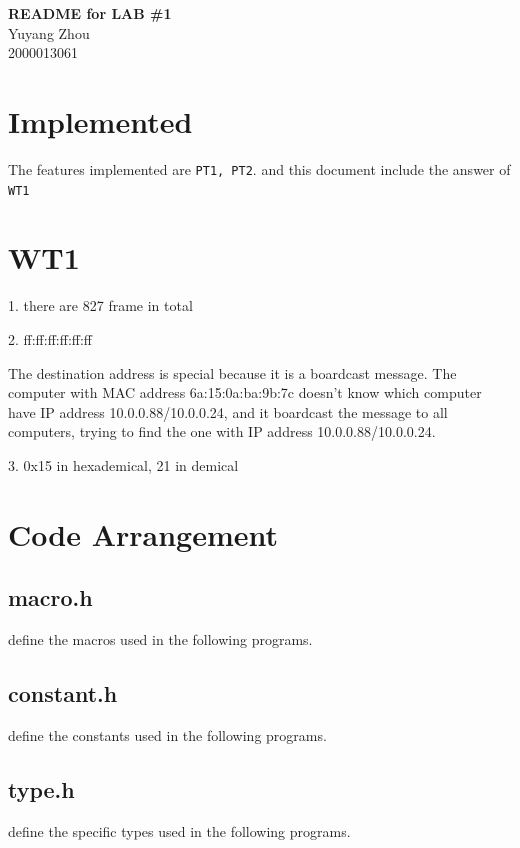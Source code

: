 \documentclass[11pt]{article}
\newcommand{\labid}{1}			%
\newcommand{\name}{Yuyang Zhou} 		%
\newcommand{\id}{2000013061} 	%
\begin{document}
    \pagestyle{fancy}
    \chead{}

    \begin{center}
        {\LARGE \bf README for LAB \#\labid}\\
        {\Large \name}\\
        {\Large \id}\\
    \end{center}

	\section{Implemented}
		\par The features implemented are \texttt{PT1, PT2}. and this document include the answer of \texttt{WT1}
		
	\section{WT1}
	
		\par 1. there are 827 frame in total
		\par 2. ff:ff:ff:ff:ff:ff
		
		The destination address is special because it is a boardcast message. 
		The computer with MAC address 6a:15:0a:ba:9b:7c doesn't know which computer have IP address 10.0.0.88/10.0.0.24, and it boardcast the message to all computers, trying to find the one with IP address 10.0.0.88/10.0.0.24.
		\par 3. 0x15 in hexademical, 21 in demical 
		
		
	\section{Code Arrangement}
	
	\subsection*{macro.h}
		\par define the macros used in the following programs.
		
	\subsection*{constant.h}
		\par define the constants used in the following programs.
		
	\subsection*{type.h}
		\par define the specific types used in the following programs.
		
\end{document}
